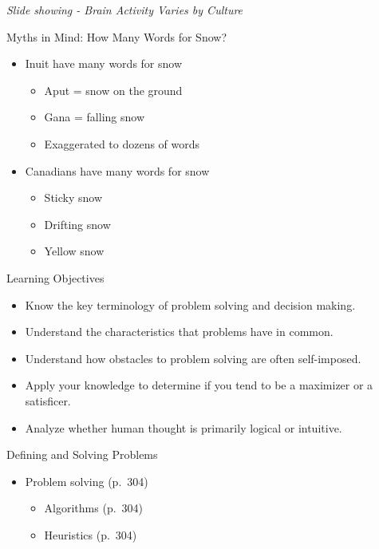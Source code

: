 \documentclass[
]{book}
\providecommand{\tightlist}{%
  \setlength{\itemsep}{0pt}\setlength{\parskip}{0pt}}
\begin{document}
\emph{Slide showing - Brain Activity Varies by Culture}

Myths in Mind: How Many Words for Snow?

\begin{itemize}
\tightlist
\item
  Inuit have many words for snow

  \begin{itemize}
  \tightlist
  \item
    Aput = snow on the ground\\
  \item
    Gana = falling snow\\
  \item
    Exaggerated to dozens of words\\
  \end{itemize}
\item
  Canadians have many words for snow

  \begin{itemize}
  \tightlist
  \item
    Sticky snow\\
  \item
    Drifting snow\\
  \item
    Yellow snow
  \end{itemize}
\end{itemize}

Learning Objectives

\begin{itemize}
\tightlist
\item
  Know the key terminology of problem solving and decision making.\\
\item
  Understand the characteristics that problems have in common.\\
\item
  Understand how obstacles to problem solving are often self-imposed.\\
\item
  Apply your knowledge to determine if you tend to be a maximizer or a satisficer.\\
\item
  Analyze whether human thought is primarily logical or intuitive.
\end{itemize}

Defining and Solving Problems

\begin{itemize}
\tightlist
\item
  Problem solving (p.~304)

  \begin{itemize}
  \tightlist
  \item
    Algorithms (p.~304)\\
  \item
    Heuristics (p.~304)
  \end{itemize}
\end{itemize}
\end{document}
